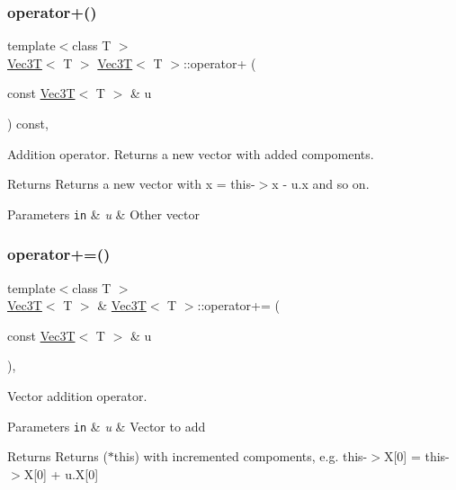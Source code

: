 \subsubsection{\texorpdfstring{operator+()}{operator+()}}
{\footnotesize\ttfamily template$<$class T $>$ \\
\hyperlink{classVec3T}{Vec3T}$<$ T $>$ \hyperlink{classVec3T}{Vec3T}$<$ T $>$\+::operator+ (\begin{DoxyParamCaption}\item[{const \hyperlink{classVec3T}{Vec3T}$<$ T $>$ \&}]{u }\end{DoxyParamCaption}) const\hspace{0.3cm}{\ttfamily [inline]}, {\ttfamily [noexcept]}}



Addition operator. Returns a new vector with added compoments. 

\begin{DoxyReturn}{Returns}
Returns a new vector with x = this-\/$>$x -\/ u.\+x and so on. 
\end{DoxyReturn}

\begin{DoxyParams}[1]{Parameters}
\mbox{\tt in}  & {\em u} & Other vector \\
\hline
\end{DoxyParams}
\mbox{\label{classVec3T_a7d06c56d8579d8b3695f43f62544f999}} 
\subsubsection{\texorpdfstring{operator+=()}{operator+=()}}
{\footnotesize\ttfamily template$<$class T $>$ \\
\hyperlink{classVec3T}{Vec3T}$<$ T $>$ \& \hyperlink{classVec3T}{Vec3T}$<$ T $>$\+::operator+= (\begin{DoxyParamCaption}\item[{const \hyperlink{classVec3T}{Vec3T}$<$ T $>$ \&}]{u }\end{DoxyParamCaption})\hspace{0.3cm}{\ttfamily [inline]}, {\ttfamily [noexcept]}}



Vector addition operator. 


\begin{DoxyParams}[1]{Parameters}
\mbox{\tt in}  & {\em u} & Vector to add \\
\hline
\end{DoxyParams}
\begin{DoxyReturn}{Returns}
Returns ($\ast$this) with incremented compoments, e.\+g. this-\/$>$X\mbox{[}0\mbox{]} = this-\/$>$X\mbox{[}0\mbox{]} + u.\+X\mbox{[}0\mbox{]} 
\end{DoxyReturn}
\mbox{\label{classVec3T_ac00a70e55a93ecd8c60d29a129f8fbf3}} 
